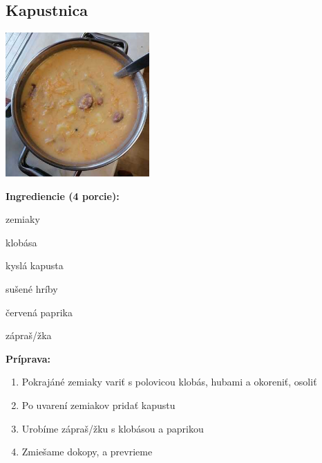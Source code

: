 \setcounter{step}{0}

\subsection{ Kapustnica }

\begin{ingredient}
  
      \includegraphics[height=5.5cm]{images/kapustnica}
  
  \def\portions{  }
  \textbf{ {\normalsize Ingrediencie (4 porcie):} }

  \begin{main}
      \item zemiaky
      \item klobása
      \item kyslá kapusta
      \item sušené hríby
      \item červená paprika
      \item zápraš/žka
  \end{main}
  
\end{ingredient}
\begin{recipe}
\textbf{ {\normalsize Príprava:} }
\begin{enumerate}

  \item{Pokrajáné zemiaky variť s polovicou klobás, hubami a okoreniť, osoliť}
  \item{Po uvarení zemiakov pridať kapustu}
  \item{Urobíme zápraš/žku s klobásou a paprikou}
  \item{Zmiešame dokopy, a prevrieme}

\end{enumerate}
\end{recipe}

\begin{notes}
  
\end{notes}	
\clearpage
